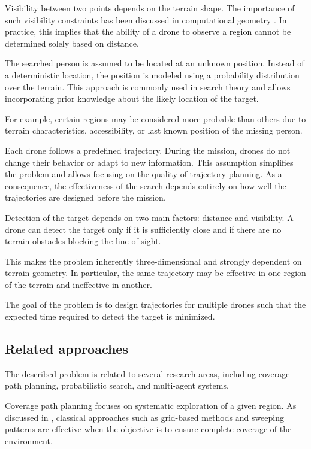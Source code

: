 \documentclass[english]{projectreport}
\begin{document}
Visibility between two points depends on the terrain shape. The importance
of such visibility constraints has been discussed in computational geometry \cite{deberg2008cg}.
In practice, this implies that the ability of a drone to observe a region
cannot be determined solely based on distance.

The searched person is assumed to be located at an unknown position.
Instead of a deterministic location, the position is modeled using a
probability distribution over the terrain. This approach is commonly used
in search theory \cite{stone1975search} and allows incorporating prior knowledge about the
likely location of the target.

For example, certain regions may be considered more probable than others
due to terrain characteristics, accessibility, or last known position
of the missing person.

Each drone follows a predefined trajectory. During the mission, drones do
not change their behavior or adapt to new information. This assumption
simplifies the problem and allows focusing on the quality of trajectory
planning. As a consequence, the effectiveness of the search depends entirely
on how well the trajectories are designed before the mission.

Detection of the target depends on two main factors: distance and visibility.
A drone can detect the target only if it is sufficiently close and if there
are no terrain obstacles blocking the line-of-sight.

This makes the problem inherently three-dimensional and strongly dependent
on terrain geometry. In particular, the same trajectory may be effective
in one region of the terrain and ineffective in another.

The goal of the problem is to design trajectories for multiple drones such
that the expected time required to detect the target is minimized.

\subsection{Related approaches}

The described problem is related to several research areas, including
coverage path planning, probabilistic search, and multi-agent systems.

Coverage path planning focuses on systematic exploration of a given region.
As discussed in \cite{choset2001coverage}, classical approaches such as grid-based methods and
sweeping patterns are effective when the objective is to ensure complete
coverage of the environment.
\end{document}
